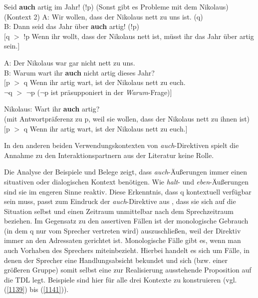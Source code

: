 {\begin{exe}
	\ex\label{1136} 
		\begin{xlist}
			\ex\label{1136a} Seid \textbf{auch} artig im Jahr! (!p) (Sonst gibt es Probleme mit dem Nikolaus) (Kontext 2)
			\ex\label{1136b} A: Wir wollen, dass der Nikolaus nett zu uns ist. (q)\\
							 B: Dann seid das Jahr über \textbf{auch} artig! (!p)\\
		$[$q $>$ !p \glq Wenn ihr wollt, dass der Nikolaus nett ist, müsst ihr das Jahr über artig sein.\grq$]$					 
		\end{xlist}
\end{exe}	

\begin{exe}
	\ex\label{1137} 
	A: Der Nikolaus war gar nicht nett zu uns.\\
	B: Warum wart ihr \textbf{auch} nicht artig dieses Jahr?\\
	$[$p $>$ q \glq Wenn ihr artig wart, ist der Nikolaus nett zu euch.\grq\\
	$\neg$q $>$ $\neg$p ($\neg$p ist präsupponiert in der \textit{Warum}-Frage)$]$
\end{exe}

\begin{exe}
	\ex\label{1138} 
	Nikolaus: Wart ihr \textbf{auch} artig?\\
	(mit Antwortpräferenz zu p, weil sie wollen, dass der Nikolaus nett zu ihnen ist)\\
	$[$p $>$ q \glq Wenn ihr artig wart, ist der Nikolaus nett zu euch.\grq$]$
\end{exe}
In den anderen beiden Verwendungskontexten von \textit{auch}-Direktiven spielt die Annahme zu den Interaktionspartnern aus der Literatur keine Rolle.

Die Analyse der Beispiele und Belege zeigt, dass \textit{auch}-Äußerungen immer einen situativen oder dialogischen Kontext benötigen. Wie \textit{halt}- und \textit{eben}-Äuße\-rungen sind sie im engeren Sinne reaktiv. Diese Erkenntnis, dass q kontextuell verfügbar sein muss, passt zum Eindruck der \textit{auch}-Direktive aus \citet[60]{Dittmann1980}, dass sie sich \glqq auf die Situation selbst und einen Zeitraum unmittelbar nach dem Sprechzeitraum\grqq{} beziehen. Im Gegensatz zu den assertiven Fällen ist der monologische Gebrauch (in dem q nur vom Sprecher vertreten wird) auszuschließen, weil der Direktiv immer an den Adressaten gerichtet ist. Monologische Fälle gibt es, wenn man auch Vorhaben des Sprechers miteinbezieht. Hierbei handelt es sich um Fälle, in denen der Sprecher eine Handlungsabsicht bekundet und sich (bzw. einer größeren Gruppe) somit selbst eine zur Realisierung ausstehende Proposition auf die TDL legt. Beispiele sind hier für alle drei Kontexte zu konstruieren (vgl. (\ref{1139}) bis (\ref{1141})).

}
